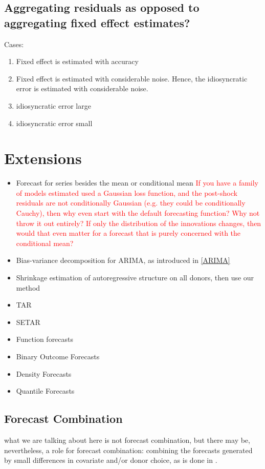 \documentclass[11pt]{article}
\theoremstyle{definition}
\begin{document}
\subsection{Aggregating residuals as opposed to aggregating fixed effect estimates?}

Cases:
\begin{enumerate}
  \item Fixed effect is estimated with accuracy 
  \item Fixed effect is estimated with considerable noise.  Hence, the idiosyncratic error is estimated with considerable noise.
  \item idiosyncratic error large
  \item idiosyncratic error small
\end{enumerate}  

\section{Extensions}\label{Extensions}

\begin{itemize}
  \item Forecast for series besides the mean or conditional mean \textcolor{red}{If you have a family of models estimated used a Gaussian loss function, and the post-shock residuals are not conditionally Gaussian (e.g. they could be conditionally Cauchy), then why even start with the default forecasting function?  Why not throw it out entirely?  If only the distribution of the innovations changes, then would that even matter for a forecast that is purely concerned with the conditional mean?}
  \item Bias-variance decomposition for ARIMA, as introduced in \ref{ARIMA} 
  \item Shrinkage estimation of autoregressive structure on all donors, then use our method
  \item TAR
  \item SETAR
  \item Function forecasts
  \item Binary Outcome Forecasts
  \item Density Forecasts
  \item Quantile Forecasts
\end{itemize}

\subsection{Forecast Combination}
what we are talking about here is not forecast combination, but there may be, nevertheless, a role for forecast combination: combining the forecasts generated by small differences in covariate and/or donor choice, as is done in \cite{lundquist2024volatility}. \\
\end{document}
